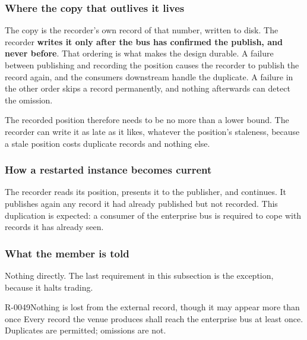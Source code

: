 \subsubsection{Where the copy that outlives it lives}
\label{sec:ha:disabled:oar:durable}

The copy is the recorder's own record of that number, written to disk. The
recorder \textbf{writes it only after the bus has confirmed the publish, and
never before}. That ordering is what makes the design durable. A failure between
publishing and recording the position causes the recorder to publish the record
again, and the consumers downstream handle the duplicate. A failure in the other
order skips a record permanently, and nothing afterwards can detect the omission.

The recorded position therefore needs to be no more than a lower bound. The
recorder can write it as late as it likes, whatever the position's staleness,
because a stale position costs duplicate records and nothing else.

\subsubsection{How a restarted instance becomes current}
\label{sec:ha:disabled:oar:recovery}

The recorder reads its position, presents it to the publisher, and continues. It
publishes again any record it had already published but not recorded. This
duplication is expected: a consumer of the enterprise bus is required to cope
with records it has already seen.

\subsubsection{What the member is told}
\label{sec:ha:disabled:oar:member}

Nothing directly. The last requirement in this subsection is the exception,
because it halts trading.

\begin{requirement}{R-0049}{Nothing is lost from the external record, though it may appear more than once}
  Every record the venue produces shall reach the enterprise bus at least once.
  Duplicates are permitted; omissions are not.
\end{requirement}

